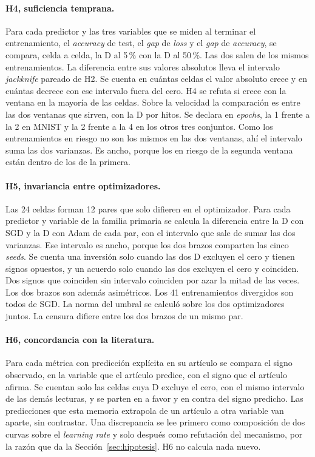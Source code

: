 \paragraph{H4, suficiencia temprana.} Para cada predictor y las tres variables que se miden al terminar el entrenamiento, el \emph{accuracy} de test, el \emph{gap} de \emph{loss} y el \emph{gap} de \emph{accuracy}, se compara, celda a celda, la D al 5\,\% con la D al 50\,\%. Las dos salen de los mismos entrenamientos. La diferencia entre sus valores absolutos lleva el intervalo \emph{jackknife} pareado de H2. Se cuenta en cuántas celdas el valor absoluto crece y en cuántas decrece con ese intervalo fuera del cero. H4 se refuta si crece con la ventana en la mayoría de las celdas. Sobre la velocidad la comparación es entre las dos ventanas que sirven, con la D por hitos. Se declara en \emph{epochs}, la 1 frente a la 2 en MNIST y la 2 frente a la 4 en los otros tres conjuntos. Como los entrenamientos en riesgo no son los mismos en las dos ventanas, ahí el intervalo suma las dos varianzas. Es ancho, porque los en riesgo de la segunda ventana están dentro de los de la primera.

\paragraph{H5, invariancia entre optimizadores.} Las 24 celdas forman 12 pares que solo difieren en el optimizador. Para cada predictor y variable de la familia primaria se calcula la diferencia entre la D con SGD y la D con Adam de cada par, con el intervalo que sale de sumar las dos varianzas. Ese intervalo es ancho, porque los dos brazos comparten las cinco \emph{seeds}. Se cuenta una inversión solo cuando las dos D excluyen el cero y tienen signos opuestos, y un acuerdo solo cuando las dos excluyen el cero y coinciden. Dos signos que coinciden sin intervalo coinciden por azar la mitad de las veces. Los dos brazos son además asimétricos. Los 41 entrenamientos divergidos son todos de SGD. La norma del umbral se calculó sobre los dos optimizadores juntos. La censura difiere entre los dos brazos de un mismo par.

\paragraph{H6, concordancia con la literatura.} Para cada métrica con predicción explícita en su artículo se compara el signo observado, en la variable que el artículo predice, con el signo que el artículo afirma. Se cuentan solo las celdas cuya D excluye el cero, con el mismo intervalo de las demás lecturas, y se parten en a favor y en contra del signo predicho. Las predicciones que esta memoria extrapola de un artículo a otra variable van aparte, sin contrastar. Una discrepancia se lee primero como composición de dos curvas sobre el \emph{learning rate} y solo después como refutación del mecanismo, por la razón que da la Sección~\ref{sec:hipotesis}. H6 no calcula nada nuevo.

